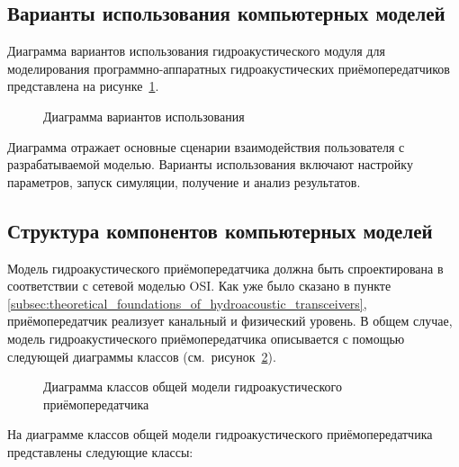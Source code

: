 \documentclass[
    numbers=section,
    document-code={ВКРБ--09.03.04--10.19--XX--26--81}
]{../latex/fqw}
\begin{document}
    \subsection{Варианты использования компьютерных моделей}
    \label{subsec:use_cases_of_computer_models}

    Диаграмма вариантов использования гидроакустического модуля для
    моделирования программно-аппаратных гидроакустических приёмопередатчиков представлена на рисунке~\ref{fig:use_case}.

    \begin{figure}[H]
        \centering
        \fbox{\rule{0pt}{20mm}\rule{40mm}{0pt}}
        \caption{Диаграмма вариантов использования}
        \label{fig:use_case}
    \end{figure}

    Диаграмма отражает основные сценарии взаимодействия пользователя с разрабатываемой моделью.
    Варианты использования включают настройку параметров, запуск симуляции, получение и анализ результатов.

    \subsection{Структура компонентов компьютерных моделей}\label{subsec:structure_of_model_components}

    Модель гидроакустического приёмопередатчика должна быть спроектирована в соответствии с сетевой моделью OSI.
    Как уже было сказано в пункте \ref{subsec:theoretical_foundations_of_hydroacoustic_transceivers},
    приёмопередатчик реализует канальный и физический уровень.
    В общем случае, модель гидроакустического приёмопередатчика описывается с помощью следующей диаграммы классов
    (см.~рисунок~\ref{fig:сlass_diagram_of_general_hydroacoustic_transceiver_model}).

    \begin{figure}[H]
        \centering
        \fbox{\rule{0pt}{20mm}\rule{40mm}{0pt}}
        \caption{Диаграмма классов общей модели гидроакустического приёмопередатчика}
        \label{fig:сlass_diagram_of_general_hydroacoustic_transceiver_model}
    \end{figure}

    На диаграмме классов общей модели гидроакустического приёмопередатчика представлены следующие классы:
\end{document}
